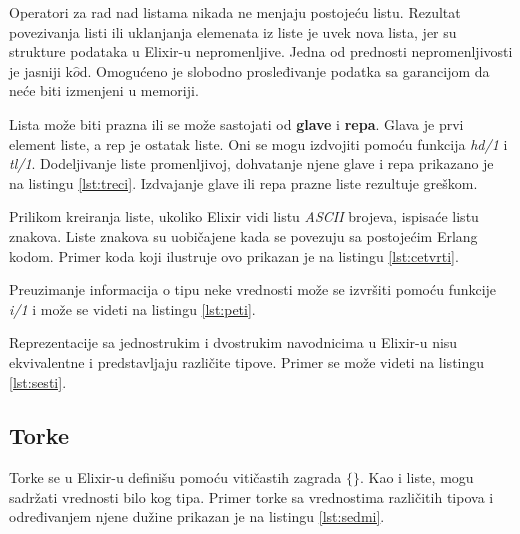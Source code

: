\documentclass[12pt,oneside]{memoir}
\begin{document}


Operatori za rad nad listama nikada ne menjaju postojeću listu. Rezultat povezivanja listi ili uklanjanja elemenata iz liste je uvek nova lista, jer su strukture podataka u Elixir-u nepromenljive. Jedna od prednosti nepromenljivosti je jasniji k$\hat{o}$d. Omogućeno je slobodno prosleđivanje podatka sa garancijom da neće biti izmenjeni u memoriji.

Lista može biti prazna ili se može sastojati od \textbf{glave} i \textbf{repa}. Glava je prvi element liste, a rep je ostatak liste. Oni se mogu izdvojiti pomoću funkcija \textit{hd/1} i \textit{tl/1}. Dodeljivanje liste promenljivoj, dohvatanje njene glave i repa prikazano je na listingu \ref{lst:treci}. Izdvajanje glave ili repa prazne liste rezultuje greškom.



Prilikom kreiranja liste, ukoliko Elixir vidi listu \textit{ASCII} brojeva, ispisaće listu znakova. Liste znakova su uobičajene kada se povezuju sa postojećim Erlang kodom. Primer koda koji ilustruje ovo prikazan je na listingu \ref{lst:cetvrti}.



 

Preuzimanje informacija o tipu neke vrednosti može se izvršiti pomoću funkcije \textit{i/1} i može se videti na listingu \ref{lst:peti}.



Reprezentacije sa jednostrukim i dvostrukim navodnicima u Elixir-u nisu ekvivalentne i predstavljaju različite tipove. Primer se može videti na listingu \ref{lst:sesti}.



\subsection{Torke}

Torke se u Elixir-u definišu pomoću vitičastih zagrada $\{\}$. Kao i liste, mogu sadržati vrednosti bilo kog tipa. Primer torke sa vrednostima različitih tipova i određivanjem njene dužine prikazan je na listingu \ref{lst:sedmi}.
\end{document}
